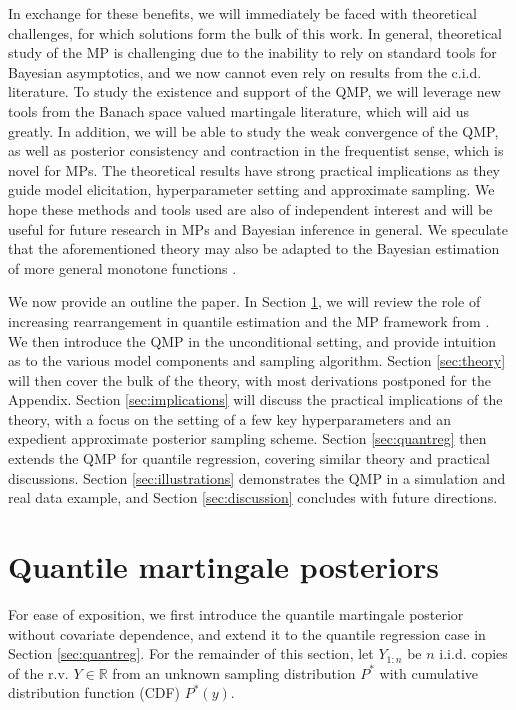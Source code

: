\documentclass[11pt,a4paper]{article}
\newcommand{\R}{\mathbb{R}}
\begin{document}
In exchange for these benefits, we will immediately be faced with theoretical challenges, for which solutions form the bulk of this work. In general, theoretical study of the MP 
is challenging due to the inability to rely on standard tools for Bayesian asymptotics, and we now cannot even rely on results from the c.i.d. literature. To study the existence and support of the QMP, we will leverage new tools from the Banach space valued martingale literature, which will aid us greatly. In addition, we will be able to study the weak convergence of the QMP, as well as  posterior consistency and contraction in the frequentist sense, which is novel for MPs. The theoretical results have strong practical implications as they guide model elicitation, hyperparameter setting and approximate sampling.  We hope these methods and tools used are also of independent interest and will be useful for future research in MPs and Bayesian inference in general. {We speculate that the aforementioned theory may also be adapted to the Bayesian estimation of more general monotone functions \citep[e.g.][]{Chakraborty2021}.}

We now provide an outline the paper. In Section \ref{sec:intro}, we will review the role of increasing rearrangement in quantile estimation and the MP framework from \cite{Fong2023a}. We then introduce the QMP in the unconditional setting, and provide intuition as to the various model components and sampling algorithm. Section \ref{sec:theory} will then cover the bulk of the theory, with most derivations postponed for the Appendix. Section \ref{sec:implications} will discuss the practical implications of the theory, with a focus on the setting of a few key hyperparameters and an expedient approximate posterior sampling scheme. Section \ref{sec:quantreg} then extends the QMP for quantile regression, covering similar theory and practical discussions. 
Section \ref{sec:illustrations} demonstrates the QMP in a simulation and real data example, and Section \ref{sec:discussion} concludes with future directions.


\section{Quantile martingale posteriors}\label{sec:intro}
For ease of exposition, we first introduce the quantile martingale posterior without covariate dependence, and extend it to the  quantile regression case in Section \ref{sec:quantreg}. For the remainder of this section, let  $Y_{1:n}$ be $n$ i.i.d. copies of the r.v. $Y \in \R$ from an unknown sampling distribution $P^*$ with cumulative distribution function (CDF) $P^*(y)$. 
\end{document}
